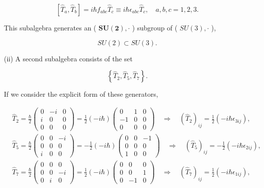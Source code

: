 \documentclass[10pt, letterpaper]{article}
\begin{document}
$$
\left[\hat{T}_{a}, \hat{T}_{b}\right]=i \hbar f_{a b c} \hat{T}_{c} \equiv i \hbar \epsilon_{a b c} \hat{T}_{c}, \quad a, b, c=1,2,3 .
$$

This subalgebra generates an ( $\boldsymbol{S U}(\mathbf{2}), \cdot$ ) subgroup of ( $S U(3), \cdot$ ),

$$
S U(2) \subset S U(3) .
$$

(ii) A second subalgebra consists of the set

$$
\left\{\hat{T}_{2}, \hat{T}_{5}, \hat{T}_{7}\right\} .
$$

If we consider the explicit form of these generators,

$$
\begin{aligned}
& \hat{T}_{2}=\frac{\hbar}{2}\left(\begin{array}{ccc}
0 & -i & 0 \\
i & 0 & 0 \\
0 & 0 & 0
\end{array}\right)=\frac{1}{2}(-i \hbar)\left(\begin{array}{ccc}
0 & 1 & 0 \\
-1 & 0 & 0 \\
0 & 0 & 0
\end{array}\right) \quad \Longrightarrow \quad\left(\hat{T}_{2}\right)_{i j}=\frac{1}{2}\left(-i \hbar \epsilon_{3 i j}\right), \\
& \hat{T}_{5}=\frac{\hbar}{2}\left(\begin{array}{ccc}
0 & 0 & -i \\
0 & 0 & 0 \\
i & 0 & 0
\end{array}\right)=-\frac{1}{2}(-i \hbar)\left(\begin{array}{ccc}
0 & 0 & -1 \\
0 & 0 & 0 \\
1 & 0 & 0
\end{array}\right) \quad \Longrightarrow \quad\left(\hat{T}_{5}\right)_{i j}=-\frac{1}{2}\left(-i \hbar \epsilon_{2 i j}\right), \\
& \hat{T}_{7}=\frac{\hbar}{2}\left(\begin{array}{ccc}
0 & 0 & 0 \\
0 & 0 & -i \\
0 & i & 0
\end{array}\right)=\frac{1}{2}(-i \hbar)\left(\begin{array}{ccc}
0 & 0 & 0 \\
0 & 0 & 1 \\
0 & -1 & 0
\end{array}\right) \quad \Longrightarrow \quad\left(\hat{T}_{7}\right)_{i j}=\frac{1}{2}\left(-i \hbar \epsilon_{1 i j}\right),
\end{aligned}
$$
\end{document}
